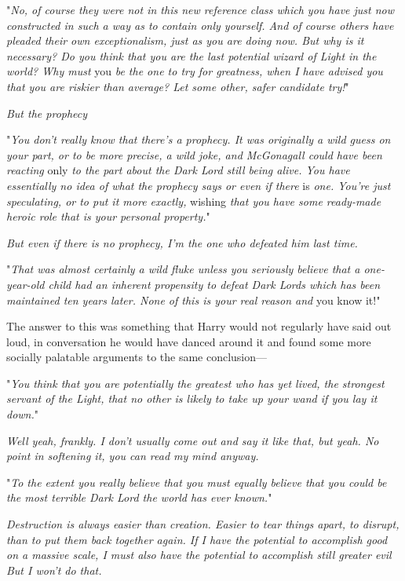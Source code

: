 "\emph{No, of course they were not in this new reference class which you have
just now constructed in such a way as to contain only yourself. And of course
others have pleaded their own exceptionalism, just as you are doing now. But
why is it necessary? Do you think that you are the last potential wizard of
Light in the world? Why must} you \emph{be the one to try for greatness, when I
have advised you that you are riskier than average? Let some other, safer
candidate try!}"

\emph{But the prophecy{\el}}

"\emph{You don't really know that there's a prophecy. It was originally a wild
guess on your part, or to be more precise, a wild joke, and McGonagall could
have been reacting} only \emph{to the part about the Dark Lord still being
alive. You have essentially no idea of what the prophecy says or even if there}
is \emph{one. You're just speculating, or to put it more exactly,} wishing
\emph{that you have some ready-made heroic role that is your personal
property.}"

\emph{But even if there is no prophecy, I'm the one who defeated him last time.}

"\emph{That was almost certainly a wild fluke unless you seriously believe that
a one-year-old child had an inherent propensity to defeat Dark Lords which has
been maintained ten years later. None of this is your real reason and} you know
it!"

The answer to this was something that Harry would not regularly have said out
loud, in conversation he would have danced around it and found some more
socially palatable arguments to the same conclusion---

"\emph{You think that you are potentially the greatest who has yet lived, the
strongest servant of the Light, that no other is likely to take up your wand if
you lay it down.}"

\emph{Well{\el} yeah, frankly. I don't usually come out and say it like
that, but yeah. No point in softening it, you can read my mind anyway.}

"\emph{To the extent you really believe that{\el} you must equally believe
that you could be the most terrible Dark Lord the world has ever known.}"

\emph{Destruction is always easier than creation. Easier to tear things apart,
to disrupt, than to put them back together again. If I have the potential to
accomplish good on a massive scale, I must also have the potential to
accomplish still greater evil{\el} But I won't do that.}

